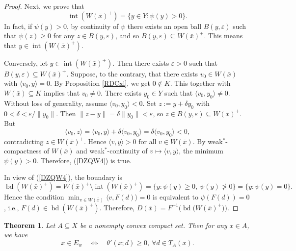 \documentclass[11pt]{article}
\newtheorem{theorem}{Theorem}[section]
\begin{document}
\begin{proof}
Next, we prove that
	\begin{equation}\label{DZQW4}
 \operatorname{int}(W(\bar{x})^{+}) = \{y\in Y:\psi(y)>0\}.
	 \end{equation}
 In fact,    if $\psi(y)>0$, by continuity of $\psi$ there exists an open ball $B(y,\varepsilon)$ such that $\psi (z) \ge 0$ for any $z \in B(y,\varepsilon)$, and so
  $B(y,\varepsilon)\subseteq W(\bar{x})^{+}$.     This means that   $y \in  \operatorname{int}(W(\bar{x})^{+})$.  
	
	Conversely, let $y\in\operatorname{int}(W(\bar{x})^{+})$. Then there exists $\varepsilon>0$ such that $B(y,\varepsilon)\subseteq W(\bar{x})^{+}$. Suppose, to the contrary, that there exists $v_0\in W(\bar{x})$ with $\langle v_0,y\rangle=0$. 
		By    Proposition   \ref{RDCxl}, we get \(0 \notin K\). This together with  $W(\bar{x})\subseteq K$  implies that    $v_0\neq0$.
	There exists $y_0 \in Y$ such that $\langle v_0, y_0 \rangle \ne 0$. Without loss of generality, assume $\langle v_0, y_0 \rangle < 0$.
	Set $z:=y+ \delta y_0$ with $0<\delta<\varepsilon/\|y_0\|$. Then $\|z-y\|=\delta\|y_0\|<\varepsilon$, so $z\in B(y,\varepsilon)\subseteq W(\bar{x})^{+}$. But
	\[
	\langle v_0,z\rangle = \langle v_0,y\rangle + \delta \langle v_0,y_0\rangle = \delta \langle v_0,y_0\rangle < 0,
	\]
	contradicting $z\in W(\bar{x})^{+}$. Hence $\langle v,y\rangle>0$ for all $v\in W(\bar{x})$. By weak$^*$-compactness of $W(\bar{x})$ and weak$^*$-continuity of $v\mapsto\langle v,y\rangle$, the minimum $\psi(y)>0$. Therefore, (\ref{DZQW4}) is true.
	
In view of  (\ref{DZQW4}), the boundary is
	\[
	\operatorname{bd}(W(\bar{x})^{+}) = W(\bar{x})^{+}\setminus\operatorname{int}(W(\bar{x})^{+})
	= \{y:\psi(y)\ge0,\ \psi(y)\not>0\} = \{y:\psi(y)=0\}.
	\]
	Hence the condition $\min_{v\in W(\bar{x})}\langle v,F(d)\rangle=0$ is equivalent to $\psi(F(d))=0$, i.e., $F(d)\in\operatorname{bd}(W(\bar{x})^{+})$. Therefore,
$	D(\bar{x}) = F^{-1}\Big(\operatorname{bd}\big(W(\bar{x})^{+}\big)\Big). $
\end{proof}

\begin{theorem}\label{ZSQE}
	Let $A \subseteq X$ be a nonempty convex compact set.
	Then for any $x\in A$,  
	we have
	\[
	x\in E_w \quad\Longleftrightarrow\quad \theta'(x;d)\ge 0,\ \forall d\in T_A(x).
	\]
\end{theorem}
\end{document}
